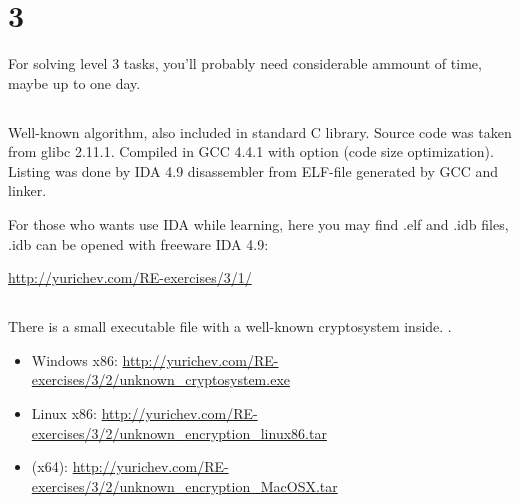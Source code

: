 \chapter{ 3}

{For solving level 3 tasks, you'll probably need considerable ammount of time, maybe up to one day}.

\section{}

{Well-known algorithm, also included in standard C library. Source code was taken from glibc 2.11.1.
Compiled in GCC 4.4.1 with  option (code size optimization).
Listing was done by IDA 4.9 disassembler from ELF-file generated by GCC and linker.}

{For those who wants use IDA while learning, here you may find .elf and .idb files,
.idb can be opened with freeware IDA 4.9:}

\url{http://yurichev.com/RE-exercises/3/1/}



\section{}

{There is a small executable file with a well-known cryptosystem inside}.
.

\begin{itemize}
\item Windows x86: \url{http://yurichev.com/RE-exercises/3/2/unknown_cryptosystem.exe}
\item Linux x86: \url{http://yurichev.com/RE-exercises/3/2/unknown_encryption_linux86.tar}
\item \MacOSX (x64): \url{http://yurichev.com/RE-exercises/3/2/unknown_encryption_MacOSX.tar}
\end{itemize}

